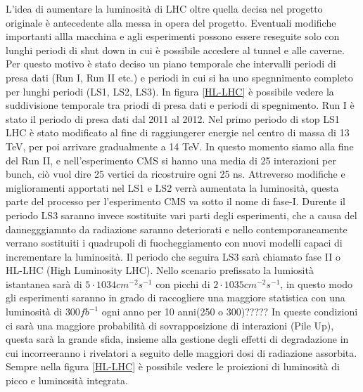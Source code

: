 L'idea di aumentare la luminosità di LHC oltre quella decisa nel progetto originale è antecedente alla messa in opera del progetto. Eventuali modifiche importanti allla macchina e agli esperimenti possono essere reseguite solo con lunghi periodi di shut down in cui è possibile accedere al tunnel e alle caverne. Per questo motivo è stato deciso un piano temporale che intervalli periodi di presa dati (Run I, Run II etc.) e periodi in cui si ha uno spegnnimento completo per lunghi periodi (LS1, LS2, LS3). In figura \ref{HL-LHC} è possibile vedere la suddivisione temporale tra priodi di presa dati e periodi di spegnimento.
Run I è stato il periodo di presa dati dal 2011 al 2012. Nel primo periodo di stop LS1 LHC è stato modificato al fine di raggiungerer energie  nel centro di massa di 13 TeV, per poi arrivare gradualmente a 14 TeV. In questo momento siamo alla fine del Run II, e nell'esperimento CMS si  hanno una media di 25 interazioni per bunch, ciò vuol dire 25 vertici da ricostruire ogni 25 ns. Attreverso modifiche  e miglioramenti apportati nel LS1 e LS2 verrà aumentata la luminosità, questa parte del processo per l'esperimento CMS va sotto il nome di fase-I. Durente il periodo LS3  saranno invece sostituite vari parti degli esperimenti, che a causa del dannegggiamnto da radiazione saranno deteriorati e nello contemporaneamente verrano sostituiti i quadrupoli di fuocheggiamento con nuovi modelli capaci di incrementare la luminosità. 
Il periodo che seguira LS3 sarà chiamato fase II o HL-LHC (High Luminosity LHC). Nello scenario prefissato la lumiosità istantanea sarà di $5 \cdot 10 34 cm^{-2} s^{-1}$ con picchi di $2 \cdot 10 35 cm^{-2} s^{-1}$, in questo modo gli esperimenti saranno in grado di raccogliere una maggiore statistica con una luminosità di $300 fb^{-1}$ ogni anno per 10 anni(250 o 300)?????%
In queste condizioni ci sarà una maggiore probabilità di sovrapposizione di interazioni (Pile Up), questa sarà la grande sfida, insieme alla gestione degli effetti di degradazione in cui incorreeranno i rivelatori a seguito delle maggiori dosi di radiazione assorbita. Sempre nella figura \ref{HL-LHC} è possibile vedere le proiezioni di luminosità di picco e luminosità integrata.
 

